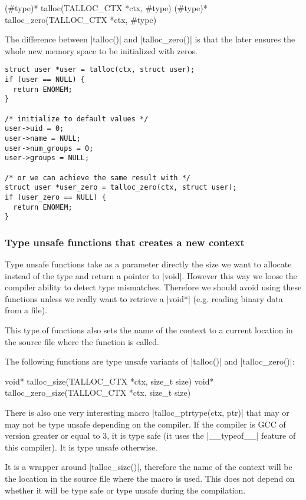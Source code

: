 \begin{funcproto}
(#type)* talloc(TALLOC_CTX *ctx, #type)
(#type)* talloc_zero(TALLOC_CTX *ctx, #type)
\end{funcproto}
\funclistend
The difference between |talloc()| and |talloc_zero()| is that the later ensures
the whole new memory space to be initialized with zeros.

\begin{lstlisting}[caption={talloc() and talloc_zero()},label=lst:talloc_zero]
struct user *user = talloc(ctx, struct user);
if (user == NULL) {
  return ENOMEM;
}

/* initialize to default values */
user->uid = 0;
user->name = NULL;
user->num_groups = 0;
user->groups = NULL;

/* or we can achieve the same result with */
struct user *user_zero = talloc_zero(ctx, struct user);
if (user_zero == NULL) {
  return ENOMEM;
}
\end{lstlisting}

\subsubsection{Type unsafe functions that creates a new context}

Type unsafe functions take as a parameter directly the size we want to
allocate instead of the type and return a pointer to |void|. However this way
we loose the compiler ability to detect type mismatches. Therefore we should
avoid using these functions unless we really want to retrieve a |void*| (e.g.
reading binary data from a file).

This type of functions also sets the name of the context to a current location
in the source file where the function is called.

The following functions are type unsafe variants of |talloc()| and
|talloc_zero()|:

\begin{funcproto}
void* talloc_size(TALLOC_CTX *ctx, size_t size)
void* talloc_zero_size(TALLOC_CTX *ctx, size_t size)
\end{funcproto}
\funclistend
There is also one very interesting macro |talloc_ptrtype(ctx, ptr)| that may or
may not be type unsafe depending on the compiler. If the compiler is GCC of
version greater or equal to 3, it is type safe (it uses the |__typeof__|
feature of this compiler). It is type unsafe otherwise.

It is a wrapper around |talloc_size()|, therefore the name of the context will
be the location in the source file where the macro is used. This does not depend
on whether it will be type safe or type unsafe during the compilation.

